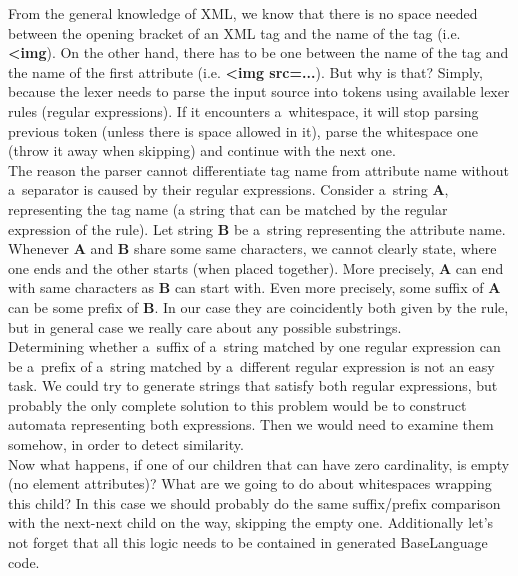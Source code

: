 From the general knowledge of XML, we know that there is no space needed between the opening bracket of an XML tag and the name of the tag (i.e. \textbf{{\textless}img}).
On the other hand, there has to be one between the name of the tag and the name of the first attribute (i.e. \textbf{{\textless}img src=...}).
But why is that?
Simply, because the lexer needs to parse the input source into tokens using available lexer rules (regular expressions).
If it encounters a~whitespace, it will stop parsing previous token (unless there is space allowed in it), parse the whitespace one (throw it away when skipping) and continue with the next one.
\\

The reason the parser cannot differentiate tag name from attribute name without a~separator is caused by their regular expressions.
Consider a~string \textbf{A}, representing the tag name (a string that can be matched by the regular expression of the  rule).
Let string \textbf{B} be a~string representing the attribute name.
Whenever \textbf{A} and \textbf{B} share some same characters, we cannot clearly state, where one ends and the other starts (when placed together).
More precisely, \textbf{A} can end with same characters as \textbf{B} can start with.
Even more precisely, some suffix of \textbf{A} can be some prefix of \textbf{B}.
In our case they are coincidently both given by the  rule, but in general case we really care about any possible substrings.
\\

Determining whether a~suffix of a~string matched by one regular expression can be a~prefix of a~string matched by a~different regular expression is not an easy task.
We could try to generate strings that satisfy both regular expressions, but probably the only complete solution to this problem would be to construct automata representing both expressions.
Then we would need to examine them somehow, in order to detect similarity.
\\

Now what happens, if one of our children that can have zero cardinality, is empty (no element attributes)?
What are we going to do about whitespaces wrapping this child?
In this case we should probably do the same suffix/prefix comparison with the next-next child on the way, skipping the empty one.
Additionally let's not forget that all this logic needs to be contained in generated BaseLanguage code.
\\

